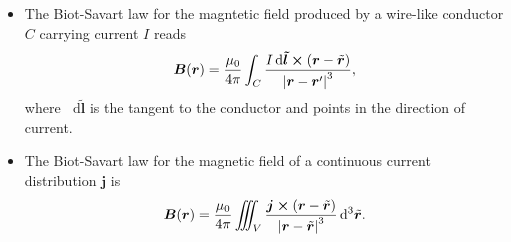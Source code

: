 \documentclass[11pt, a4paper]{article}
\newcommand{\diff}{\mathop{}\!\mathrm{d}} %
\newcommand{\dtr}{\diff^{3} \tilde{\r}}  %
\renewcommand{\vec}[1]{\bm{#1}} %
\renewcommand{\r}{\vec{r}}
\newcommand{\B}{\vec{B}} %
\newcommand{\mm}{\mu_{0}}  %
\renewcommand{\j}{\vec{j}}  %
\begin{document}
\begin{itemize}
    \item The Biot-Savart law for the magntetic field produced by a wire-like conductor $ C $ carrying current $ I $ reads
    \begin{equation*}
        \B(\r) = \frac{\mm}{4 \pi} \int_{C} \frac{I \diff \vec{\tilde{l}} \cross (\r - \tilde{\r})}{\abs{\r - \r'}^{3}},
    \end{equation*}
    where $ \diff \vec{\tilde{l}} $ is the tangent to the conductor and points in the direction of current.
    

    \item The Biot-Savart law for the magnetic field of a continuous current distribution $ \j $ is
    \begin{equation*}
        \B(\r) = \frac{\mm}{4\pi} \iiint_{V} \frac{\j \cross (\r - \tilde{\r})}{\abs{\r - \tilde{\r}}^{3}} \dtr.
    \end{equation*}
    
    
\end{itemize}
\end{document}
